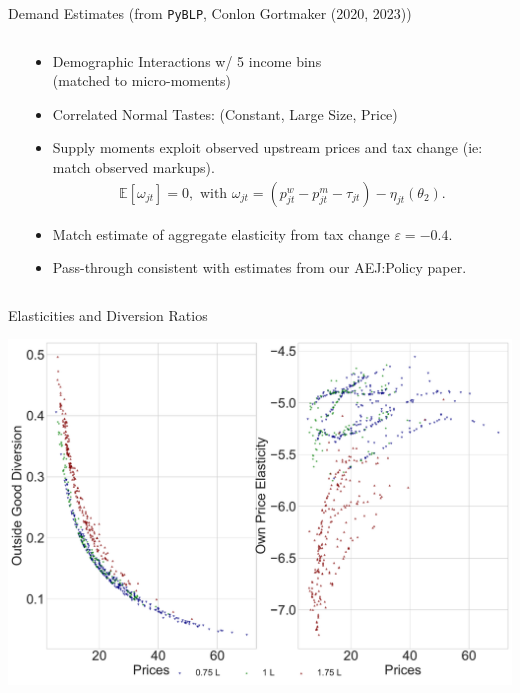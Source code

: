 \begin{frame}{Demand Estimates (from \texttt{PyBLP}, Conlon Gortmaker (2020, 2023))}
\begin{columns}[T]
 \hspace{-1.5cm}
 \begin{column}{.68\textwidth}
\vspace{-0.3cm}
    \begin{center}
    \scalebox{0.55}{
     
    }
    \end{center}
  \end{column}
  \hfill
 \hspace{-2.2cm}
\begin{column}{.55\textwidth}
  \begin{itemize}
    \item Demographic Interactions w/ 5 income bins \\ (matched to micro-moments)
    \item Correlated Normal Tastes: (Constant, Large Size, Price)
    \item Supply moments exploit observed upstream prices and tax change (ie: match observed markups).
    \vspace{-0.2cm}
    \begin{align*}
    \mathbb{E}[\omega_{jt}]=0, \text{ with }\omega_{jt} = \left(p^w_{jt}  - p^m_{jt}-\tau_{jt} \right) -\eta_{jt}\left(\theta_2\right).
    \end{align*}
   \vspace{-0.8cm}
    \item Match estimate of aggregate elasticity from tax change $\varepsilon=-0.4$.
    \item Pass-through consistent with estimates from our AEJ:Policy paper.
  \end{itemize}
\end{column}
\end{columns}
\end{frame}

\begin{frame}{Elasticities and Diversion Ratios}
\begin{center}
    \includegraphics[height=0.95\textheight]{../demand/resources/figure6_outside_diversion_elas_v2.pdf}
\end{center}
\end{frame}



